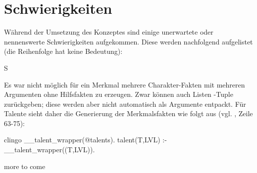 \section{Schwierigkeiten}\label{sec:probleme}

Während der Umsetzung des Konzeptes sind einige unerwartete oder nennenswerte Schwierigkeiten aufgekommen.
Diese werden nachfolgend aufgelistet (die Reihenfolge hat keine Bedeutung):

\begin{enumerateWithCode}{S}
    \item Es war nicht möglich für ein Merkmal mehrere Charakter-Fakten mit mehreren Argumenten ohne Hilfsfakten zu erzeugen.
    Zwar können  auch Listen \bzw {}-Tuple zurückgeben; diese werden aber nicht automatisch als Argumente entpackt.
    Für \zB Talente sieht daher die Generierung der Merkmalsfakten wie folgt aus (vgl. , Zeile 63-75):
    \begin{mintedNameless}[linenos=false]{clingo}
__talent_wrapper(@talents).
talent(T,LVL) :- __talent_wrapper((T,LVL)).
    \end{mintedNameless}

    {\color{red}\item more to come}
\end{enumerateWithCode}
